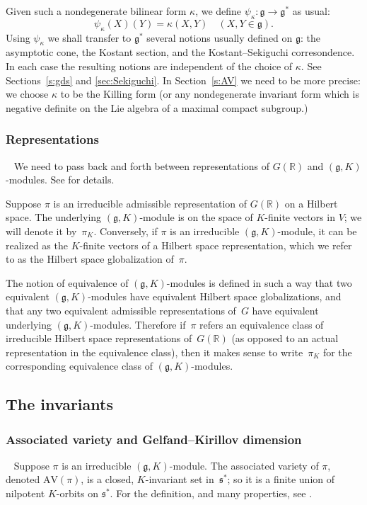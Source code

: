 \documentclass[cupthm]{CUP-JNL-JMJ}
\numberwithin{equation}{section}
\theoremstyle{cupplain}
\theoremstyle{cupdefinition}
\theoremstyle{cupremark}
\theoremstyle{cupproof}
\newcommand{\R}{\mathbb R}
\newcommand{\g}{\mathfrak g}
\newcommand{\s}{\mathfrak s}
\newcommand{\AV}{\mathrm{AV}}
\begin{document}
Given such a nondegenerate bilinear form $\kappa$, we define
$\psi_\kappa: \g\rightarrow \g^*$ as usual:
$$
\psi_\kappa(X)(Y)=\kappa(X,Y)\quad (X,Y\in\g).
$$
Using $\psi_\kappa$ we shall transfer to $\g^\ast$ several notions usually defined on $\g$: the asymptotic cone, the Kostant section, and the Kostant--Sekiguchi corresondence. In each case the resulting notions are independent of the
choice of $\kappa$. See Sections~\ref{s:gds} and \ref{sec:Sekiguchi}.
In Section~\ref{s:AV} we need to be more precise: we choose  $\kappa$ to be the Killing form  (or any nondegenerate
invariant form which is negative definite on the Lie algebra of a maximal compact subgroup.)

\subsubsection{Representations}~
We need to pass back and forth between representations of $G(\R)$ and $(\g,K)$-modules.
See \cite[Chapter~0]{greenbook} for details.

Suppose $\pi$ is an irreducible admissible representation of $G(\R)$  on a Hilbert space. 
The underlying
$(\g,K)$-module is on the space of $K$-finite vectors in
$V$; we will denote it by~$\pi_K$. 
Conversely, if $\pi$ is an irreducible $(\g,K)$-module, it can be
realized as the $K$-finite vectors of a Hilbert space representation, which we
refer to as the Hilbert space globalization of~$\pi$.

The notion of equivalence of $(\g, K)$-modules is defined in such a way that two equivalent $(\g, K)$-modules have equivalent Hilbert space globalizations, and that any two equivalent admissible representations of~$G$ have equivalent underlying $(\g, K)$-modules. Therefore if~$\pi$ refers an equivalence class of irreducible Hilbert space representations of~$G(\R)$ (as opposed to an actual representation in the equivalence class), then it makes sense to write~$\pi_K$ for the corresponding equivalence class of $(\g, K)$-modules.

\subsection{The invariants}\label{sec:invariants}


\subsubsection{Associated variety and Gelfand--Kirillov dimension}~
Suppose $\pi$ is an irreducible $(\g,K)$-module.
The associated variety of $\pi$, denoted $\AV(\pi)$, is a closed, $K$-invariant set in~$\s^*$; so it is a finite union of
nilpotent $K$-orbits on $\s^*$. For the definition, and many properties, see \cite[Section 5]{vogan_bowdoin}. 
\end{document}
